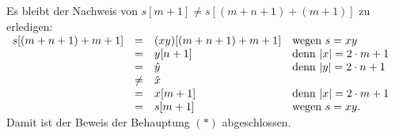 \noindent
Es bleibt der Nachweis von  $s[m+1] \not= s[(m+n+1) + (m+1)]$ zu erledigen:
\\[0.2cm]
\hspace*{1.3cm}
$
\begin{array}[t]{lcll}
  s[(m+n+1) + m + 1] &     = & (xy)[(m+n+1) + m + 1]  & \mbox{wegen $s = xy$} \\
                     &     = & y[n+1]  & \mbox{denn $|x| = 2 \cdot m + 1$}    \\
                     &     = & \hat{y} & \mbox{denn $|y| = 2 \cdot n + 1$}    \\
                     & \not= & \hat{x}                                        \\
                     &     = & x[m+1]  & \mbox{denn $|x| = 2 \cdot m + 1$}    \\
                     &     = & s[m+1]  & \mbox{wegen $s = xy$}.
\end{array}
$
\\[0.2cm]
Damit ist der Beweis der Behauptung $(*)$ abgeschlossen.
\vspace{0.2cm}

